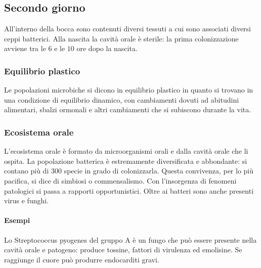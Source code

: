 	\subsection{Secondo giorno}
	All'interno della bocca sono contenuti diversi tessuti a cui sono associati diversi ceppi batterici.
	Alla nascita la cavit\`a orale \`e sterile: la prima colonizzazione avviene tra le $6$ e le $10$ ore dopo la nascita.
	
		\subsubsection{Equilibrio plastico}
		Le popolazioni microbiche si dicono in equilibrio plastico in quanto si trovano in una condizione di equilibrio dinamico, con cambiamenti dovuti ad abitudini alimentari, sbalzi ormonali e altri cambiamenti che si subiscono durante la vita.

		\subsubsection{Ecosistema orale}
		L'ecosistema orale \`e formato da microorganismi orali e dalla cavit\`a orale che li ospita.
		La popolazione batterica \`e estremamente diversificata e abbondante: si contano pi\`u di $300$ specie in grado di colonizzarla.
		Questa convivenza, per lo pi\`u pacifica, si dice di simbiosi o commensalismo.
		Con l'insorgenza di fenomeni patologici si passa a rapporti opportunistici.
		Oltre ai batteri sono anche presenti virus e funghi.
		
			\paragraph{Esempi}
			Lo Streptococcus pyogenes del gruppo A \`e un fungo che pu\`o essere presente nella cavit\`a orale e patogeno: produce tossine, fattori di virulenza ed emolisine.
			Se raggiunge il cuore pu\`o produrre endocarditi gravi.

